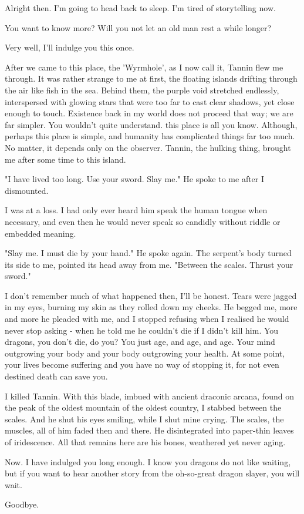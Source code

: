 Alright then. I'm going to head back to sleep. I'm tired of storytelling now.

You want to know more? Will you not let an old man rest a while longer?

Very well, I'll indulge you this once.

After we came to this place, the 'Wyrmhole', as I now call it, Tannin flew me through. It was rather strange to me at first, the floating islands drifting through the air like fish in the sea. Behind them, the purple void stretched endlessly, interspersed with glowing stars that were too far to cast clear shadows, yet close enough to touch. Existence back in my world does not proceed that way; we are far simpler. You wouldn't quite understand. this place is all you know. Although, perhaps this place is simple, and humanity has complicated things far too much. No matter, it depends only on the observer.  Tannin, the hulking thing, brought me after some time to this island. 

"I have lived too long. Use your sword. Slay me." He spoke to me after I dismounted. 

I was at a loss. I had only ever heard him speak the human tongue when necessary, and even then he would never speak so candidly without riddle or embedded meaning. 

"Slay me. I must die by your hand." He spoke again. The serpent's body turned its side to me, pointed its head away from me. "Between the scales. Thrust your sword."

I don't remember much of what happened then, I'll be honest. Tears were jagged in my eyes, burning my skin as they rolled down my cheeks. He begged me, more and more he pleaded with me, and I stopped refusing when I realised he would never stop asking - when he told me he couldn't die if I didn't kill him. You dragons, you don't die, do you? You just age, and age, and age. Your mind outgrowing your body and your body outgrowing your health. At some point, your lives become suffering and you have no way of stopping it, for not even destined death can save you. 

I killed Tannin. With this blade, imbued with ancient draconic arcana, found on the peak of the oldest mountain of the oldest country, I stabbed between the scales. And he shut his eyes smiling, while I shut mine crying. The scales, the muscles, all of him faded then and there. He disintegrated into paper-thin leaves of iridescence. All that remains here are his bones, weathered yet never aging.

Now. I have indulged you long enough. I know you dragons do not like waiting, but if you want to hear another story from the oh-so-great dragon slayer, you will wait. 

Goodbye.